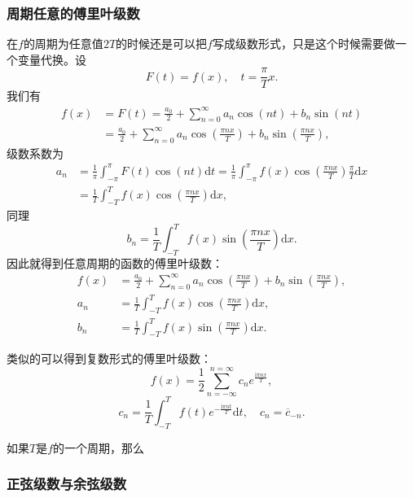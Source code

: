 \hypertarget{ux5468ux671fux4efbux610fux7684sec:fourier-series}{%
\subsubsection{周期任意的傅里叶级数}\label{ux5468ux671fux4efbux610fux7684sec:fourier-series}}

在$f$的周期为任意值$2T$的时候还是可以把$f$写成级数形式，只是这个时候需要做一个变量代换。设
\[
F(t) = f(x), \quad t = \frac{\pi}{T} x.
\] 
我们有 
\[
\begin{aligned}
    f(x) &= F(t) = \frac{a_0}{2} + \sum_{n=0}^{\infty} a_n \cos (nt) + b_n \sin(nt) \\
    &= \frac{a_0}{2} + \sum_{n=0}^{\infty} a_n \cos \left(\frac{\pi n x}{T}\right) + b_n \sin \left(\frac{\pi n x}{T}\right),
\end{aligned}
\]
级数系数为
\[
\begin{aligned}
    a_n &= \frac{1}{\pi} \int_{-\pi}^\pi F(t) \cos(nt) \mathrm{d}t = \frac{1}{\pi} \int_{-\pi}^\pi f(x) \cos \left(\frac{\pi n x}{T} \right) \frac{\pi}{T} \mathrm{d}x \\
    &= \frac{1}{T} \int_{-T}^T f(x) \cos \left(\frac{\pi n x}{T} \right) \mathrm{d}x,
\end{aligned}
\]
同理
\[
b_n = \frac{1}{T} \int_{-T}^T f(x) \sin \left(\frac{\pi n x}{T} \right) \mathrm{d}x.
\]
因此就得到任意周期的函数的傅里叶级数：
\[
\begin{aligned}
    f(x) &= \frac{a_0}{2} + \sum_{n=0}^{\infty} a_n \cos \left(\frac{\pi n x}{T}\right) + b_n \sin \left(\frac{\pi n x}{T}\right), \\
    a_n &= \frac{1}{T} \int_{-T}^T f(x) \cos \left(\frac{\pi n x}{T} \right) \mathrm{d}x, \\
    b_n &= \frac{1}{T} \int_{-T}^T f(x) \sin \left(\frac{\pi n x}{T} \right) \mathrm{d}x.
\end{aligned}
\]

类似的可以得到复数形式的傅里叶级数：
\[
f(x) = \frac{1}{2} \sum_{n = -\infty}^{n = \infty} c_n e^{\frac{\mathrm{i}\pi n x}{T}}, 
\]
\[
c_n = \frac{1}{T}\int_{-T}^{T} f(t) e^{-\frac{\mathrm{i}\pi n t}{T}} \mathrm{d}t, \quad c_n = \overline{c}_{-n}.
\]

如果$T$是$f$的一个周期，那么

\hypertarget{ux6b63ux5f26ux7ea7ux6570ux4e0eux4f59ux5f26ux7ea7ux6570}{%
\subsubsection{正弦级数与余弦级数}\label{ux6b63ux5f26ux7ea7ux6570ux4e0eux4f59ux5f26ux7ea7ux6570}}

